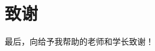 \documentclass[../main]{subfiles}
\begin{document}
\chapter{致谢}%
\label{cha:致谢}

最后，向给予我帮助的老师和学长致谢！
\end{document}
